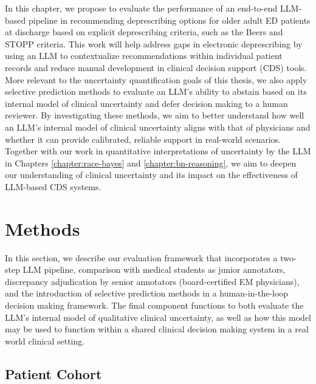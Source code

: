 In this chapter, we propose to evaluate the performance of an end-to-end LLM-based pipeline in recommending deprescribing options for older adult ED patients at discharge based on explicit deprescribing criteria, such as the Beers and STOPP criteria. This work will help address gaps in electronic deprescribing by using an LLM to contextualize recommendations within individual patient records and reduce manual development in clinical decision support (CDS) tools. More relevant to the uncertainty quantification goals of this thesis, we also apply selective prediction methods to evaluate an LLM's ability to abstain based on its internal model of clinical uncertainty and defer decision making to a human reviewer. By investigating these methods, we aim to better understand how well an LLM's internal model of clinical uncertainty aligns with that of physicians and whether it can provide calibrated, reliable support in real-world scenarios. Together with our work in quantitative interpretations of uncertainty by the LLM in Chapters \ref{chapter:race-bayes} and \ref{chapter:bn-reasoning}, we aim to deepen our understanding of clinical uncertainty and its impact on the effectiveness of LLM-based CDS systems.

\section{Methods}

In this section, we describe our evaluation framework that incorporates a two-step LLM pipeline, comparison with medical students as junior annotators, discrepancy adjudication by senior annotators (board-certified EM physicians), and the introduction of selective prediction methods in a human-in-the-loop decision making framework. The final component functions to both evaluate the LLM's internal model of qualitative clinical uncertainty, as well as how this model may be used to function within a shared clinical decision making system in a real world clinical setting. 

\subsection{Patient Cohort}

